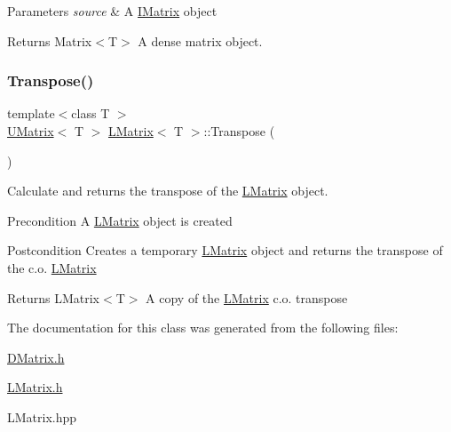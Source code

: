\begin{DoxyParams}{Parameters}
{\em source} & A \mbox{\hyperlink{class_i_matrix}{I\+Matrix}} object \\
\hline
\end{DoxyParams}
\begin{DoxyReturn}{Returns}
Matrix$<$\+T$>$ A dense matrix object. 
\end{DoxyReturn}
\mbox{\label{class_l_matrix_afe89d1c0c91d284ff0277da586dc667a}} 
\subsubsection{\texorpdfstring{Transpose()}{Transpose()}}
{\footnotesize\ttfamily template$<$class T $>$ \\
\mbox{\hyperlink{class_u_matrix}{U\+Matrix}}$<$ T $>$ \mbox{\hyperlink{class_l_matrix}{L\+Matrix}}$<$ T $>$\+::Transpose (\begin{DoxyParamCaption}{ }\end{DoxyParamCaption})}



Calculate and returns the transpose of the \mbox{\hyperlink{class_l_matrix}{L\+Matrix}} object. 

\begin{DoxyPrecond}{Precondition}
A \mbox{\hyperlink{class_l_matrix}{L\+Matrix}} object is created 
\end{DoxyPrecond}
\begin{DoxyPostcond}{Postcondition}
Creates a temporary \mbox{\hyperlink{class_l_matrix}{L\+Matrix}} object and returns the transpose of the c.\+o. \mbox{\hyperlink{class_l_matrix}{L\+Matrix}} 
\end{DoxyPostcond}
\begin{DoxyReturn}{Returns}
L\+Matrix$<$\+T$>$ A copy of the \mbox{\hyperlink{class_l_matrix}{L\+Matrix}} c.\+o. transpose 
\end{DoxyReturn}


The documentation for this class was generated from the following files\+:\begin{DoxyCompactItemize}
\item 
\mbox{\hyperlink{_d_matrix_8h}{D\+Matrix.\+h}}\item 
\mbox{\hyperlink{_l_matrix_8h}{L\+Matrix.\+h}}\item 
L\+Matrix.\+hpp\end{DoxyCompactItemize}

